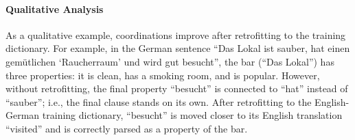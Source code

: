 \paragraph{Qualitative Analysis}
As a qualitative example, coordinations improve after
retrofitting to the training dictionary.
For example, in the German sentence ``Das Lokal ist sauber, hat einen
gem\"utlichen `Raucherraum' und wird gut besucht'', the bar (``Das Lokal'') has
three properties: it is clean, has a smoking room, and is popular.
However, without retrofitting, the final property ``besucht'' is
connected to ``hat'' instead of ``sauber''; i.e., the final clause
stands on its own.
After retrofitting to the English-German training dictionary, ``besucht'' is
moved closer to its English translation ``visited'' and is correctly parsed as
a property of the bar.
